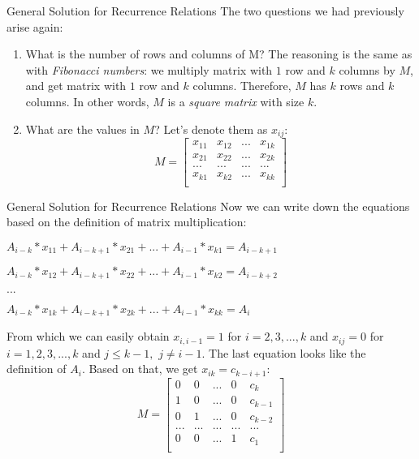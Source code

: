 \documentclass{beamer}
\begin{document}
\begin{frame}{General Solution for Recurrence Relations}
  The two questions we had previously arise again:
  \begin{enumerate}
    \item What is the number of rows and columns of M?
      \newline
       The reasoning is the same as with \textit{Fibonacci numbers}:
       \newline
       we multiply matrix with $1$ row and $k$ columns by $M$, and get matrix with $1$ row and $k$ columns.
       \newline
      Therefore, $M$ has $k$ rows and $k$ columns.
      In other words, $M$ is a \textit{square matrix} with size $k$.
    \item What are the values in $M$?
      Let's denote them as $x_{ij}$:
      \newline
      \[
        M = 
        \left[ {
          \begin{array}{cccc}
            x_{11} & x_{12} & ... & x_{1k} \\
            x_{21} & x_{22} & ... & x_{2k} \\
            ... & ... & ... & ... \\
            x_{k1} & x_{k2} & ... & x_{kk} \\
          \end{array} } 
        \right]
      \]

  \end{enumerate}
\end{frame}

\begin{frame}{General Solution for Recurrence Relations}
  Now we can write down the equations based on the definition of matrix multiplication:
  \newline
  \centerline{$A_{i-k}*x_{11} + A_{i-k+1}*x_{21} + ... + A_{i-1}*x_{k1} = A_{i-k+1}$}
  \newline
  \centerline{$A_{i-k}*x_{12} + A_{i-k+1}*x_{22} + ... + A_{i-1}*x_{k2} = A_{i-k+2}$}
  \newline
  \centerline{$...$}
  \newline
  \centerline{$A_{i-k}*x_{1k} + A_{i-k+1}*x_{2k} + ... + A_{i-1}*x_{kk} = A_{i}$}
  \newline\newline
  From which we can easily obtain $x_{i,i-1} = 1$ for $i = 2, 3, ..., k$ and 
  $x_{ij} = 0$ for $i = 1, 2, 3, ..., k$ and $j \leq k - 1,$ $j \neq i - 1$.
  \newline
  The last equation looks like the definition of $A_i$. Based on that, we get $x_{ik} = c_{k-i+1}$:
  \[
    M = 
    \left[ {
      \begin{array}{ccccc}
        0 & 0 & ... & 0 & c_k \\
        1 & 0 & ... & 0 & c_{k-1} \\
        0 & 1 & ... & 0 & c_{k-2} \\
        ... & ... & ... & ... & ... \\
        0 & 0 & ... & 1 & c_1 \\
      \end{array} } 
    \right]
  \]
\end{frame}
\end{document}
